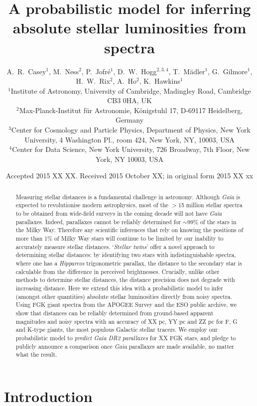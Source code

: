 \documentclass[useAMS,usenatbib]{mn2e}
\title[Inferring absolute stellar luminosities]{A probabilistic model for 
    inferring absolute stellar luminosities from spectra}
\author[Casey et al.]{A.~R.~Casey$^1$, M.~Ness$^2$, P.~Jofr\'e$^1$, 
    D.~W.~Hogg$^{2,3,4}$, T.~M\"adler$^1$, G.~Gilmore$^1$, 
    H.~W.~Rix$^2$, \newauthor A.~Ho$^2$, K.~Hawkins$^1$ \\ 
$^1$Institute of Astronomy, University of Cambridge, Madingley Road, Cambridge
    CB3 0HA, UK\\
$^2$Max-Planck-Institut f\"ur Astronomie, K\"onigstuhl 17, D-69117 Heidelberg,
    Germany\\
$^3$Center for Cosmology and Particle Physics, Department of Physics, New York
    University, 4 Washington Pl., room 424, New York, NY, 10003, USA\\
$^4$Center for Data Science, New York University, 726 Broadway, 7th Floor,
    New York, NY 10003, USA}
\begin{document}
\date{Accepted 2015 XX XX. Received 2015 October XX; in original form 2015 XX xx}

\pagerange{\pageref{firstpage}--\pageref{lastpage}} 

\maketitle

\label{firstpage}

\begin{abstract}
Measuring stellar distances is a fundamental challenge in astronomy. Although 
\textit{Gaia} is expected to revolutionise modern astrophysics, most of the 
$>$15 million stellar spectra to be obtained from wide-field surveys in the 
coming decade will not have \textit{Gaia} parallaxes. Indeed, parallaxes cannot 
be reliably determined for $\sim$99\% of the stars in the Milky Way. Therefore 
any scientific inferences that rely on knowing the positions of more than 1\% of 
Milky Way stars will continue to be limited by our inability to accurately 
measure stellar distances. `\textit{Stellar twins}' offer a novel approach to 
determining stellar distances: by identifying two stars with indistinguishable 
spectra, where one has a \textit{Hipparcos} trigonometric parallax, the distance
 to the secondary star is calculable from the difference in perceived 
 brightnesses. Crucially, unlike other methods to determine stellar distances, 
the distance precision does not degrade with increasing distance. Here we extend
 this idea with a probabilistic model to infer (amongst other quantities) 
absolute stellar luminosities directly from noisy spectra. Using FGK giant 
spectra from the APOGEE Survey and the ESO public archive, we show that 
distances can be reliably determined from ground-based apparent magnitudes and 
noisy spectra with an accuracy of XX pc, YY pc and ZZ pc for F, G and K-type 
giants, the most populous Galactic stellar tracers. We employ our probabilistic 
model to \textit{predict Gaia DR2 parallaxes} for XX FGK stars, and pledge to 
publicly announce a comparison once \textit{Gaia} parallaxes are made available,
 no matter what the result.
\end{abstract}

\begin{keywords}
\end{keywords}

\section{Introduction}
\end{document}
